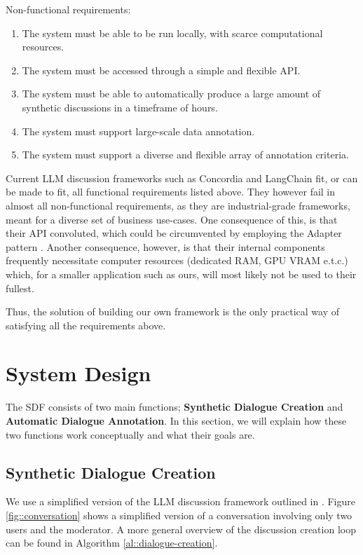 Non-functional requirements:
\begin{enumerate}
	\item The system must be able to be run locally, with scarce computational resources.
	\item The system must be accessed through a simple and flexible \ac{API}.
	\item The system must be able to automatically produce a large amount of synthetic discussions in a timeframe of hours.
	\item The system must support large-scale data annotation.
	\item The system must support a diverse and flexible array of annotation criteria.
\end{enumerate}

Current LLM discussion frameworks such as Concordia \cite{Vezhnevets2023GenerativeAM} and LangChain \cite{langchain} fit, or can be made to fit, all functional requirements listed above. They however fail in almost all non-functional requirements, as they are industrial-grade frameworks, meant for a diverse set of business use-cases. One consequence of this, is that their \ac{API} convoluted, which could be circumvented by employing the Adapter pattern \cite{gamma1995design}. Another consequence, however, is that their internal components frequently necessitate computer resources (dedicated RAM, GPU VRAM e.t.c.) which, for a smaller application such as ours, will most likely not be used to their fullest.

Thus, the solution of building our own framework is the only practical way of satisfying all the requirements above.



\section{System Design}
\label{sec:system:design-system}

The \ac{SDF} consists of two main functions; \textbf{Synthetic Dialogue Creation} and \textbf{Automatic Dialogue Annotation}. In this section, we will explain how these two functions work conceptually and what their goals are.


\subsection{Synthetic Dialogue Creation}
\label{ssec:system:creation}

We use a simplified version of the LLM discussion framework outlined in \citet{abdelnabi2024cooperationcompetitionmaliciousnessllmstakeholders}. Figure \ref{fig::conversation} shows a simplified version of a conversation involving only two users and the moderator. A more general overview of the discussion creation loop can be found in Algorithm \ref{al::dialogue-creation}.

